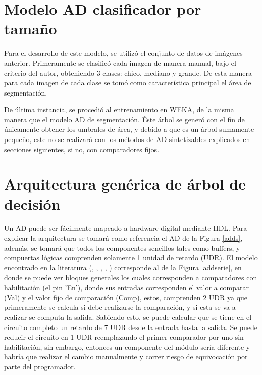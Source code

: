 \documentclass[twoside,spanish,ESP,MSc]{plantillaLabUPV}
\theoremstyle{definition}
\begin{document}
\section{Modelo AD clasificador por tamaño}

Para el desarrollo de este modelo, se utilizó el conjunto de datos de imágenes anterior. Primeramente se clasificó cada imagen de manera manual, bajo el criterio del autor, obteniendo 3 clases: chico, mediano y grande. De esta manera para cada imagen de cada clase se tomó como característica principal el área de segmentación.

De última instancia, se procedió al entrenamiento en WEKA, de la misma manera que el modelo AD de segmentación. Éste árbol se generó con el fin de únicamente obtener los umbrales de área, y debido a que es un árbol sumamente pequeño, este no se realizará con los métodos de AD sintetizables explicados en secciones siguientes, si no, con comparadores fijos.


\section{Arquitectura genérica de árbol de decisión}

Un AD puede ser fácilmente mapeado a hardware digital mediante HDL. Para explicar la arquitectura se tomará como referencia el AD de la Figura \ref{adds}, además, se tomará que todos los componentes sencillos tales como buffers, y compuertas lógicas comprenden solamente 1 unidad de retardo (UDR). El modelo encontrado en la literatura (\cite{ad1}, \cite{6034358}, \cite{4211794}, \cite{ad2}, \cite{ad3}) corresponde al de la Figura \ref{addserie}, en donde se puede ver bloques generales los cuales corresponden a comparadores con habilitación (el pin 'En'), donde sus entradas corresponden el valor a comparar (Val) y el valor fijo de comparación (Comp), estos, comprenden 2 UDR ya que primeramente se calcula si debe realizarse la comparación, y si esta se va a realizar se computa la salida. Sabiendo esto, se puede calcular que se tiene en el circuito completo un retardo de 7 UDR desde la entrada hasta la salida. Se puede reducir el circuito en 1 UDR reemplazando el primer comparador por uno sin habilitación, sin embargo, entonces un componente del módulo sería diferente y habría que realizar el cambio manualmente y correr riesgo de equivocación por parte del programador.
\end{document}

